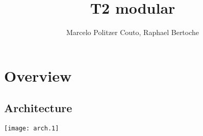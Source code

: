 \documentclass{article}
\title{T2 modular}
\author{Marcelo Politzer Couto, Raphael Bertoche}
\begin{document}
\maketitle

\section{Overview}

\subsection{Architecture}
\texttt{[image: arch.1]}
\end{document}
